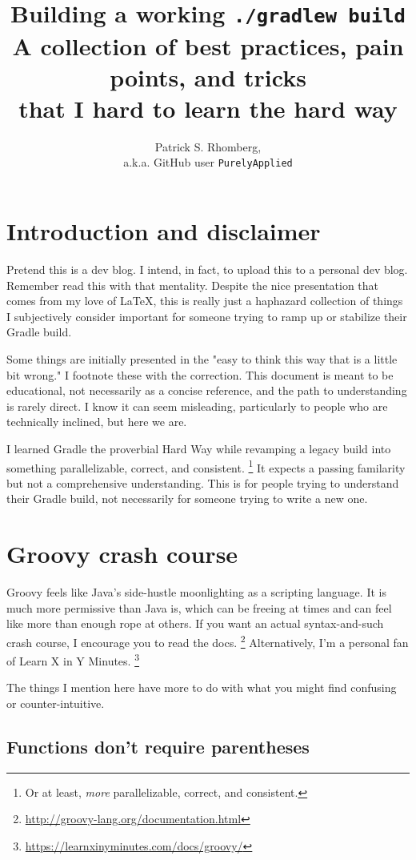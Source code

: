 \documentclass[]{article}
\title{Building a working \texttt{./gradlew build}  \large \\
  A collection of best practices, pain points, and tricks \\
  that I hard to learn the hard way}
\author{Patrick S. Rhomberg,\\ a.k.a. GitHub user \texttt{PurelyApplied}}
\theoremstyle{definition}
\begin{document}
\maketitle
\tableofcontents
\newpage

\section{Introduction and disclaimer}

Pretend this is a dev blog.
I intend, in fact, to upload this to a personal dev blog.
Remember read this with that mentality.
Despite the nice presentation that comes from my love of \LaTeX, 
this is really just a haphazard collection of things I subjectively consider important for someone trying to ramp up or stabilize their Gradle build.

Some things are initially presented in the "easy to think this way that is a little bit wrong."
I footnote these with the correction.
This document is meant to be educational, not necessarily as a concise reference, and the path to understanding is rarely direct.
I know it can seem misleading, particularly to people who are technically inclined, but here we are.

I learned Gradle the proverbial Hard Way while revamping a legacy build into something parallelizable, correct, and consistent.%
\footnote{Or at least, \emph{more} parallelizable, correct, and consistent.}
It expects a passing familarity but not a comprehensive understanding.
This is for people trying to understand their Gradle build,
  not necessarily for someone trying to write a new one.


\section{Groovy crash course}

Groovy feels like Java's side-hustle moonlighting as a scripting language.
It is much more permissive than Java is,
  which can be freeing at times and can feel like more than enough rope at others.
If you want an actual syntax-and-such crash course, I encourage you to read the docs.%
\footnote{\url{http://groovy-lang.org/documentation.html}}
Alternatively, I'm a personal fan of Learn X in Y Minutes.%
\footnote{\url{https://learnxinyminutes.com/docs/groovy/}}

The things I mention here have more to do with what you might find confusing or counter-intuitive.

\subsection{Functions don't require parentheses}
\end{document}
